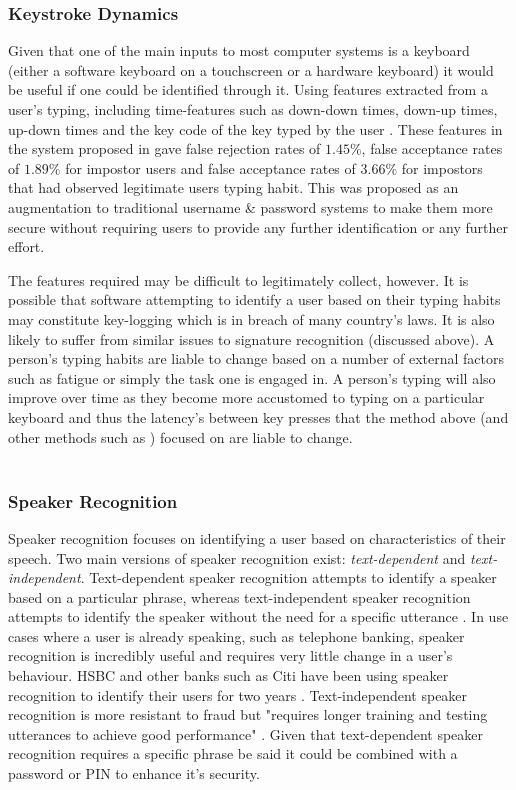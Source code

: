 \documentclass[12pt]{article}
\begin{document}
	\subsubsection{Keystroke Dynamics}
	\label{subsubsect:keystroke_dynamics}
	Given that one of the main inputs to most computer systems is a keyboard (either a software keyboard on a touchscreen or a hardware keyboard) it would be useful if one could be identified through it. Using features extracted from a user's typing, including time-features such as down-down times, down-up times, up-down times and the key code of the key typed by the user \citep{typing_auth2005}. These features in the system proposed in \cite{typing_auth2005} gave false rejection rates of $1.45\%$, false acceptance rates of $1.89\%$ for impostor users and false acceptance rates of $3.66\%$ for impostors that had observed legitimate users typing habit. This was proposed as an augmentation to traditional username \& password systems to make them more secure without requiring users to provide any further identification or any further effort.
	
	The features required may be difficult to legitimately collect, however. It is possible that software attempting to identify a user based on their typing habits may constitute key-logging which is in breach of many country's laws. It is also likely to suffer from similar issues to signature recognition (discussed above). A person's typing habits are liable to change based on a number of external factors such as fatigue or simply the task one is engaged in. A person's typing will also improve over time as they become more accustomed to typing on a particular keyboard and thus the latency's between key presses that the method above (and other methods such as \cite{shepherd_ibm_keystroke_auth1995}) focused on are liable to change.
	\\
	\\
	\subsubsection{Speaker Recognition}
	\label{subsubsect:speaker_recognition}
	Speaker recognition focuses on identifying a user based on characteristics of their speech. Two main versions of speaker recognition exist: \emph{text-dependent} and \emph{text-independent}. Text-dependent speaker recognition attempts to identify a speaker based on a particular phrase, whereas text-independent speaker recognition attempts to identify the speaker without the need for a specific utterance \citep{microsoft_2006}. In use cases where a user is already speaking, such as telephone banking, speaker recognition is incredibly useful and requires very little change in a user's behaviour. HSBC and other banks such as Citi have been using speaker recognition to identify their users for two years \citep{kollewe_2016}. Text-independent speaker recognition is more resistant to fraud \citep{jain2004introduction} but "requires longer training and testing utterances to achieve good performance" \citep{microsoft_2006}. Given that text-dependent speaker recognition requires a specific phrase be said it could be combined with a password or PIN to enhance it's security.
	
\end{document}
